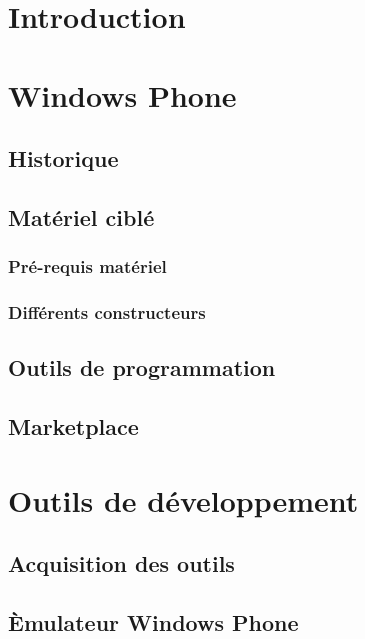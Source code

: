 \documentclass[twoside,UTF8]{EPURapport}
\begin{document}
\chapter{Introduction}


\chapter{Windows Phone}
\section{Historique}

\section{Matériel ciblé}
	\subsection{Pré-requis matériel}
	\subsection{Différents constructeurs}
	
\section{Outils de programmation}

\section{Marketplace}

	
\chapter{Outils de développement}
	\section{Acquisition des outils}
	
	\section{\`Emulateur Windows Phone}
	
\end{document}
